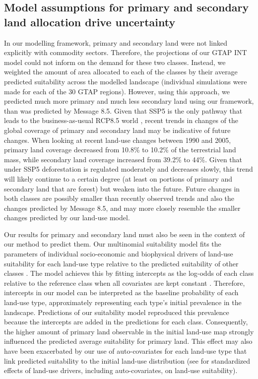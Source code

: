\documentclass[titlesmallcaps,copyrightpage]{uomthesis}\usepackage[]{graphicx}\usepackage[]{color}
\begin{document}
\subsection{Model assumptions for primary and secondary land allocation drive uncertainty}

In our modelling framework, primary and secondary land were not linked explicitly with commodity sectors. Therefore, the projections of our GTAP INT model could not inform on the demand for these two classes. Instead, we weighted the amount of area allocated to each of the classes by their average predicted suitability across the modelled landscape (individual simulations were made for each of the 30 GTAP regions). However, using this approach, we predicted much more primary and much less secondary land using our framework, than was predicted by Message 8.5. Given that SSP5 is the only pathway that leads to the business-as-usual RCP8.5 world \citep{zittis_business-as-usual_2021}, recent trends in changes of the global coverage of primary and secondary land may be indicative of future changes. When looking at recent land-use changes between 1990 and 2005, primary land coverage decreased from 10.8\% to 10.2\% of the terrestrial land mass, while secondary land coverage increased from 39.2\% to 44\%. Given that under SSP5 deforestation is regulated moderately and decreases slowly, this trend will likely continue to a certain degree (at least on portions of primary and secondary land that are forest) but weaken into the future. Future changes in both classes are possibly smaller than recently observed trends and also the changes predicted by Message 8.5, and may more closely resemble the smaller changes predicted by our land-use model.

Our results for primary and secondary land must also be seen in the context of our method to predict them. Our multinomial suitability model fits the parameters of individual socio-economic and biophysical drivers of land-use suitability for each land-use type relative to the predicted suitability of other classes \citep{kapitza_predictive_2020}. The model achieves this by fitting intercepts as the log-odds of each class relative to the reference class when all covariates are kept constant \citep{sun_multinomial_2017}. Therefore, intercepts in our model can be interpreted as the baseline probability of each land-use type, approximately representing each type's initial prevalence in the landscape. Predictions of our suitability model reproduced this prevalence because the intercepts are added in the predictions for each class. Consequently, the higher amount of primary land observable in the initial land-use map strongly influenced the predicted average suitability for primary land. This effect may also have been exacerbated by our use of auto-covariates for each land-use type that link predicted suitability to the initial land-use distribution (see  for standardized effects of land-use drivers, including auto-covariates, on land-use suitability).
\end{document}
